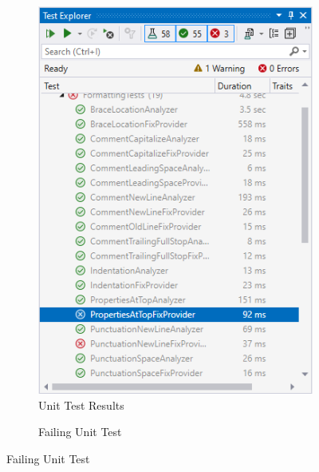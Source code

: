 \begin{figure}[H]
    \centering
    \caption{Unit Tests}
    \label{fig:UnitTests}
    \begin{subfigure}[t]{0.35\textwidth}
        \caption{Unit Test Results}
        \label{fig:UnitTestResults}
        \includegraphics[height=0.35\textheight, keepaspectratio]{Figures/IDEUnitTestsCropped2.png}
    \end{subfigure}
    \begin{subfigure}[t]{0.35\textwidth}
        \caption{Failing Unit Test}
        \label{fig:UnitTestFailing}

\end{subfigure}
\end{figure}
